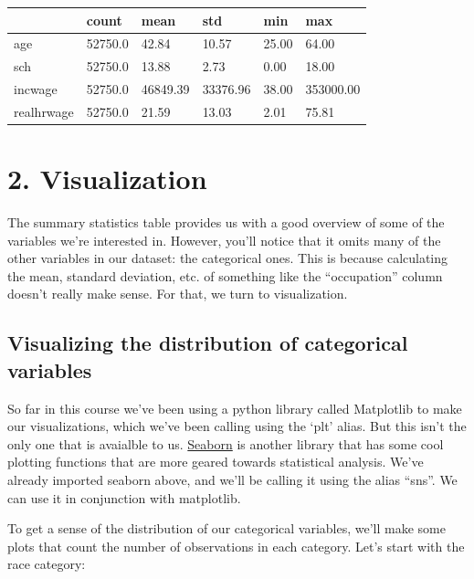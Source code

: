 \documentclass[
  letterpaper,
  DIV=11,
  numbers=noendperiod]{scrreprt}
\begin{document}
\begin{longtable}[]{@{}llllll@{}}
\toprule\noalign{}
& count & mean & std & min & max \\
\midrule\noalign{}
\endhead
\bottomrule\noalign{}
\endlastfoot
age & 52750.0 & 42.84 & 10.57 & 25.00 & 64.00 \\
sch & 52750.0 & 13.88 & 2.73 & 0.00 & 18.00 \\
incwage & 52750.0 & 46849.39 & 33376.96 & 38.00 & 353000.00 \\
realhrwage & 52750.0 & 21.59 & 13.03 & 2.01 & 75.81 \\
\end{longtable}

\hypertarget{visualization}{%
\section{2. Visualization}\label{visualization}}

The summary statistics table provides us with a good overview of some of
the variables we're interested in. However, you'll notice that it omits
many of the other variables in our dataset: the categorical ones. This
is because calculating the mean, standard deviation, etc. of something
like the ``occupation'' column doesn't really make sense. For that, we
turn to visualization.

\hypertarget{visualizing-the-distribution-of-categorical-variables}{%
\subsection{Visualizing the distribution of categorical
variables}\label{visualizing-the-distribution-of-categorical-variables}}

So far in this course we've been using a python library called
Matplotlib to make our visualizations, which we've been calling using
the `plt' alias. But this isn't the only one that is avaialble to us.
\href{https://seaborn.pydata.org/}{Seaborn} is another library that has
some cool plotting functions that are more geared towards statistical
analysis. We've already imported seaborn above, and we'll be calling it
using the alias ``sns''. We can use it in conjunction with matplotlib.

To get a sense of the distribution of our categorical variables, we'll
make some plots that count the number of observations in each category.
Let's start with the race category:
\end{document}
